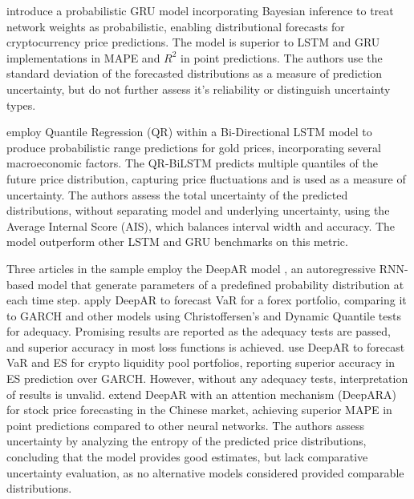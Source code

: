 \textcite{Golnari2024Cryptocurrency} introduce a probabilistic GRU model incorporating Bayesian inference to treat network weights as probabilistic, enabling distributional forecasts for cryptocurrency price predictions. The model is superior to LSTM and GRU implementations in MAPE and $R^2$ in point predictions. The authors use the standard deviation of the forecasted distributions as a measure of prediction uncertainty, but do not further assess it's reliability or distinguish uncertainty types.  

\textcite{Wang2024GoldForecasting} employ Quantile Regression (QR) within a Bi-Directional LSTM model to produce probabilistic range predictions for gold prices, incorporating several macroeconomic factors. The QR-BiLSTM predicts multiple quantiles of the future price distribution, capturing price fluctuations and is used as a measure of uncertainty. The authors assess the total uncertainty of the predicted distributions, without separating model and underlying uncertainty, using the Average Internal Score (AIS), which balances interval width and accuracy. The model outperform other LSTM and GRU benchmarks on this metric. 

Three articles in the sample employ the DeepAR model \parencite{Salinas2019DeepAR}, an autoregressive RNN-based model that generate parameters of a predefined probability distribution at each time step. \textcite{Fatouros2023DeepVaR} apply DeepAR to forecast VaR for a forex portfolio, comparing it to GARCH and other models using Christoffersen's and Dynamic Quantile tests for adequacy. Promising results are reported as the adequacy tests are passed, and superior accuracy in most loss functions is achieved. \textcite{Almeida2024RiskForecasting} use DeepAR to forecast VaR and ES for crypto liquidity pool portfolios, reporting superior accuracy in ES prediction over GARCH. However, without any adequacy tests, interpretation of results is unvalid. \textcite{Li2024DeepAR} extend DeepAR with an attention mechanism (DeepARA) for stock price forecasting in the Chinese market, achieving superior MAPE in point predictions compared to other neural networks. The authors assess uncertainty by analyzing the entropy of the predicted price distributions, concluding that the model provides good estimates, but lack comparative uncertainty evaluation, as no alternative models considered provided comparable distributions.  



